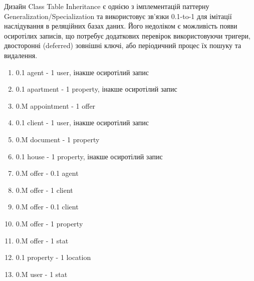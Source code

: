 Дизайн Class Table Inheritance є однією з імплементацій паттерну
Generalization/Specialization та використовує зв'язки 0.1-to-1
для імітації наслідування в реляційних базах даних. Його недоліком є
можливість появи осиротілих записів, що потребує додаткових перевірок
використовуючи тригери, двосторонні (deferred) зовнішні ключі,
або періодичний процес їх пошуку та видалення.

\begin{enumerate}
    \item 0.1 agent - 1 user, інакше осиротілий запис
    \item 0.1 apartment - 1 property, інакше осиротілий запис
    \item 0.M appointment - 1 offer
    \item 0.1 client - 1 user, інакше осиротілий запис
    \item 0.M document - 1 property
    \item 0.1 house - 1 property, інакше осиротілий запис
    \item 0.M offer - 0.1 agent
    \item 0.M offer - 1 client
    \item 0.M offer - 0.1 client
    \item 0.M offer - 1 property
    \item 0.M offer - 1 stat
    \item 0.1 property - 1 location
    \item 0.M user - 1 stat
\end{enumerate}
